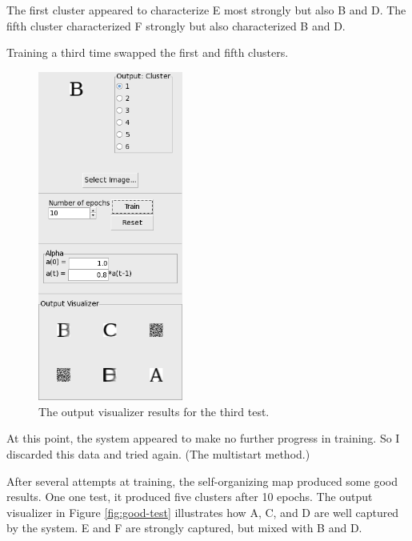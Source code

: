 \documentclass[12pt,letterpaper,oneside]{report}
\begin{document}
The first cluster appeared to characterize E most strongly but also B and D. The fifth cluster characterized F strongly but also characterized B and D.

Training a third time swapped the first and fifth clusters.

\begin{figure}[ht]
  \centering
  \includegraphics[width=180px]{diagrams/third-test.png} 
  \caption{The output visualizer results for the third test.}
  \label{fig:third-test}
\end{figure}

At this point, the system appeared to make no further progress in training. So I discarded this data and tried again. (The multistart method.)

After several attempts at training, the self-organizing map produced some good results. One one test, it produced five clusters after 10 epochs. The output visualizer in Figure \ref{fig:good-test} illustrates how A, C, and D are well captured by the system. E and F are strongly captured, but mixed with B and D.
\end{document}
